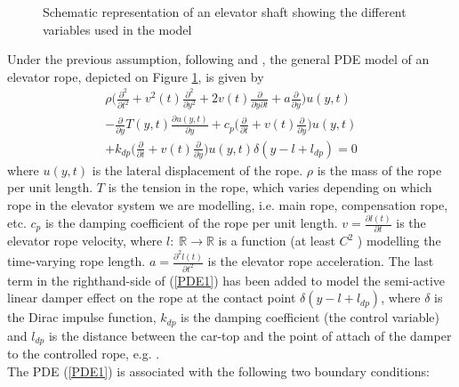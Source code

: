\documentclass[letterpaper, 11 pt, conference]{ieeeconf}
\begin{document}
\begin{figure}
\vspace{-0.5cm}
  \begin{center}
\hspace{-0.8cm}\vspace{-0.5cm}
\caption{Schematic representation of an elevator shaft showing the
different variables used in the model}


    \label{fig1}
 \end{center}
 \end{figure}
Under the previous assumption, following \cite{ZX03,K011} and
\cite{ZC06}, the general PDE model of an elevator rope, depicted
on Figure \ref{fig1}, is given by
\begin{equation}\label{PDE1}
\begin{array}{l}
\rho(\frac{\partial^2}{\partial
t^2}+v^{2}(t)\frac{\partial^2}{\partial
y^2}+2v(t)\frac{\partial}{\partial y\partial
t}+a\frac{\partial}{\partial
y}\big)u(y,t)\\-\frac{\partial}{\partial y}T(y,t)\frac{\partial
u(y,t)}{\partial y}+c_{p}\big(\frac{\partial}{\partial
t}+v(t)\frac{\partial}{\partial
y}\big)u(y,t)\\+k_{dp}\big(\frac{\partial}{\partial
t}+v(t)\frac{\partial}{\partial y}\big)u(y,t)\delta(y-l+l_{dp})=0
\end{array}
\end{equation}
where $u(y,t)$ is the lateral displacement of the rope. $\rho$ is
the mass of the rope per unit length. $T$ is the tension in the
rope, which varies depending on which rope in the elevator system
we are modelling, i.e. main rope, compensation rope, etc. $c_{p}$
is the damping coefficient of the rope per unit length.
$v=\frac{\partial l(t)}{\partial t}$ is the elevator rope
velocity, where $l:\;\mathbb{R}\rightarrow\mathbb{R}$ is a
function (at least $C^{2}$ ) modelling the time-varying rope
length. $a=\frac{\partial^2 l(t)}{\partial t^2}$ is the elevator
rope acceleration. The last term in the righthand-side of
(\ref{PDE1}) has been added to model the semi-active linear damper
effect on the rope at the contact point $\delta(y-l+l_{dp})$,
where $\delta$ is the Dirac impulse function, $k_{dp}$ is the
damping coefficient (the control variable) and $l_{dp}$ is the
distance between the car-top and the
point of attach of the damper to the controlled rope, e.g. \cite{ZC06}.\\
The PDE (\ref{PDE1}) is associated with the following two boundary
conditions:
\end{document}
